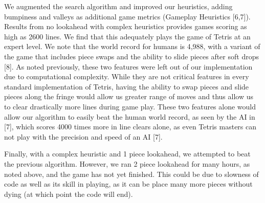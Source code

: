 \documentclass[12pt]{article}
\begin{document}
We augmented the search algorithm and improved our heuristics, adding bumpiness and valleys as additional game metrics (Gameplay Heuristics [6,7]). Results from no lookahead with complex heuristics provides games scoring as high as 2600 lines. We find that this adequately plays the game of Tetris at an expert level. We note that the world record for humans is 4,988, with a variant of the game that includes piece swaps and the ability to slide pieces after soft drops [8]. As noted previously, these two features were left out of our implementation due to computational complexity. While they are not critical features in every standard implementation of Tetris, having the ability to swap pieces and slide pieces along the fringe would allow us greater range of moves and thus allow us to clear drastically more lines during game play. These two features alone would allow our algorithm to easily beat the human world record, as seen by the AI in [7], which scores 4000 times more in line clears alone, as even Tetris masters can not play with the precision and speed of an AI [7].

Finally, with a complex heuristic and 1 piece lookahead, we attempted to beat the previous algorithm. However, we ran 2 piece lookahead for many hours, as noted above, and the game has not yet finished. This could be due to slowness of code as well as its skill in playing, as it can be place many more pieces without dying (at which point the code will end).
\end{document}
